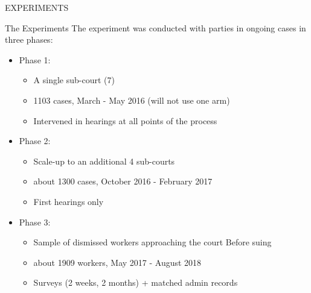 \documentclass[9pt]{beamer}
\begin{document}
\begin{frame}{}
    \vfill
    \begin{center}
        \Large
        EXPERIMENTS
    \end{center}
\end{frame}

\begin{frame}{The Experiments}{}
The experiment was conducted with parties in ongoing cases in three phases:
 
 \vspace{2mm}
   \begin{itemize}
       \item Phase 1: 
       \begin{itemize}
           \item A single sub-court (7)
           \item 1103 cases, March - May 2016 (will not use one arm)
           \item Intervened in hearings at all points of the process
       \end{itemize}
  \pause     
  \vspace{2mm}
       \item Phase 2: 
       \begin{itemize}
           \item Scale-up to an additional 4 sub-courts
           \item about 1300 cases, October 2016 - February 2017
           \item \alert{First hearings only}
       \end{itemize}
\pause
\vspace{2mm}
    \item Phase 3:
    \begin{itemize}
           \item Sample of dismissed workers approaching the court \alert{Before suing}
           \item about 1909 workers, May 2017 - August 2018
           \item Surveys (2 weeks, 2 months) + matched admin records
       \end{itemize}
       \end{itemize}
\end{frame}
\end{document}
